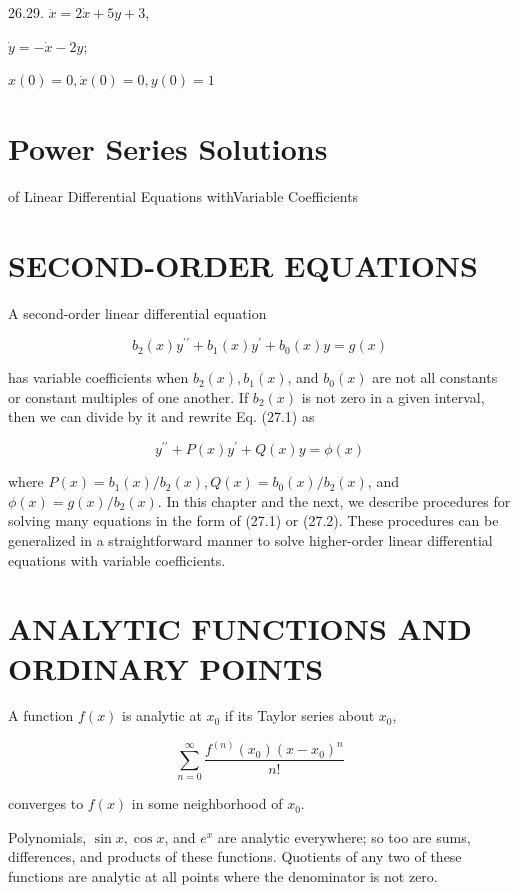 \documentclass[10pt]{article}
\begin{document}
26.29. $\ddot{x}=2 \dot{x}+5 y+3$,

$\dot{y}=-\dot{x}-2 y$;

$x(0)=0, \dot{x}(0)=0, y(0)=1$

\section*{Power Series Solutions}
 of Linear Differential Equations withVariable Coefficients

\section*{SECOND-ORDER EQUATIONS}
A second-order linear differential equation


\begin{equation*}
b_{2}(x) y^{\prime \prime}+b_{1}(x) y^{\prime}+b_{0}(x) y=g(x) \tag{27.1}
\end{equation*}


has variable coefficients when $b_{2}(x), b_{1}(x)$, and $b_{0}(x)$ are not all constants or constant multiples of one another. If $b_{2}(x)$ is not zero in a given interval, then we can divide by it and rewrite Eq. (27.1) as


\begin{equation*}
y^{\prime \prime}+P(x) y^{\prime}+Q(x) y=\phi(x) \tag{27.2}
\end{equation*}


where $P(x)=b_{1}(x) / b_{2}(x), Q(x)=b_{0}(x) / b_{2}(x)$, and $\phi(x)=g(x) / b_{2}(x)$. In this chapter and the next, we describe procedures for solving many equations in the form of (27.1) or (27.2). These procedures can be generalized in a straightforward manner to solve higher-order linear differential equations with variable coefficients.

\section*{ANALYTIC FUNCTIONS AND ORDINARY POINTS}
A function $f(x)$ is analytic at $x_{0}$ if its Taylor series about $x_{0}$,

$$
\sum_{n=0}^{\infty} \frac{f^{(n)}\left(x_{0}\right)\left(x-x_{0}\right)^{n}}{n !}
$$

converges to $f(x)$ in some neighborhood of $x_{0}$.

Polynomials, $\sin x, \cos x$, and $e^{x}$ are analytic everywhere; so too are sums, differences, and products of these functions. Quotients of any two of these functions are analytic at all points where the denominator is not zero.
\end{document}
